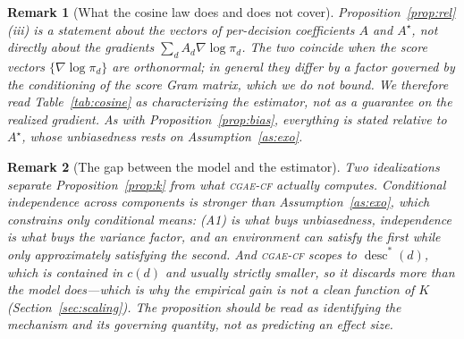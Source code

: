 \documentclass[review,authoryear,3p,times]{elsarticle}
\newtheorem{remark}{Remark}
\newcommand{\cflow}{\textsc{cgae-cf}}          %
\newcommand{\desc}{\operatorname{desc}}
\begin{document}
\begin{remark}[What the cosine law does and does not cover]
Proposition~\ref{prop:rel}(iii) is a statement about the vectors of
per-decision \emph{coefficients} $A$ and $A^{\star}$, not directly about the
gradients $\sum_d A_d\nabla\log\pi_d$. The two coincide when the score vectors
$\{\nabla\log\pi_d\}$ are orthonormal; in general they differ by a factor
governed by the conditioning of the score Gram matrix, which we do not bound.
We therefore read Table~\ref{tab:cosine} as characterizing the estimator, not
as a guarantee on the realized gradient. As with
Proposition~\ref{prop:bias}, everything is stated \emph{relative} to
$A^{\star}$, whose unbiasedness rests on Assumption~\ref{as:exo}.
\end{remark}
\begin{remark}[The gap between the model and the estimator]
Two idealizations separate Proposition~\ref{prop:k} from what \cflow{} actually
computes. Conditional independence across components is stronger than
Assumption~\ref{as:exo}, which constrains only conditional means: (A1) is what
buys unbiasedness, independence is what buys the variance factor, and an
environment can satisfy the first while only approximately satisfying the
second. And \cflow{} scopes to $\desc^{*}(d)$, which is contained in $c(d)$ and
usually strictly smaller, so it discards more than the model does---which is why
the empirical gain is not a clean function of $K$ (Section~\ref{sec:scaling}).
The proposition should be read as identifying the mechanism and its governing
quantity, not as predicting an effect size.
\end{remark}
\end{document}
